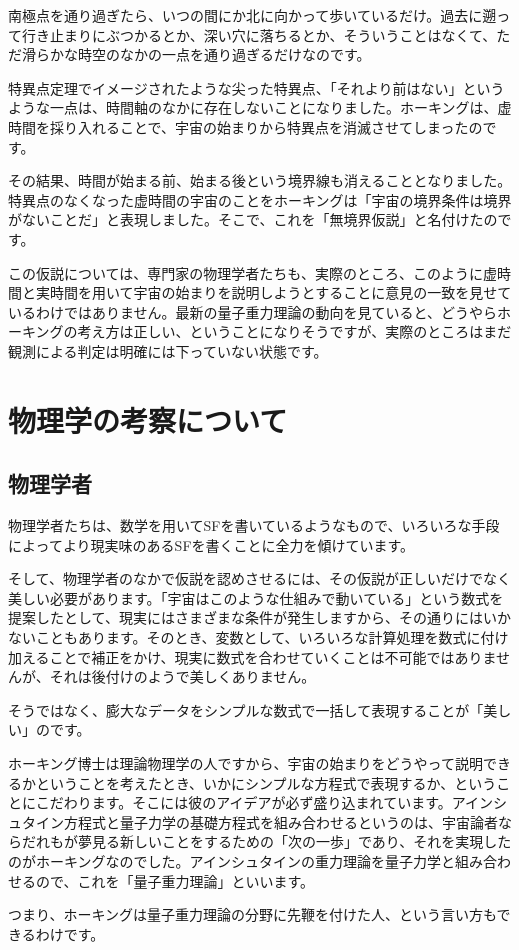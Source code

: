 \documentclass[10pt,b5paper,papersize,dvipdfmx]{jsbook}
\begin{document}
南極点を通り過ぎたら、いつの間にか北に向かって歩いているだけ。過去に遡って行き止まりにぶつかるとか、深い穴に落ちるとか、そういうことはなくて、ただ滑らかな時空のなかの一点を通り過ぎるだけなのです。\par
特異点定理でイメージされたような尖った特異点、「それより前はない」というような一点は、時間軸のなかに存在しないことになりました。ホーキングは、虚時間を採り入れることで、宇宙の始まりから特異点を消滅させてしまったのです。\par
その結果、時間が始まる前、始まる後という境界線も消えることとなりました。特異点のなくなった虚時間の宇宙のことをホーキングは「宇宙の境界条件は境界がないことだ」と表現しました。そこで、これを「無境界仮説」と名付けたのです。\par
この仮説については、専門家の物理学者たちも、実際のところ、このように虚時間と実時間を用いて宇宙の始まりを説明しようとすることに意見の一致を見せているわけではありません。最新の量子重力理論の動向を見ていると、どうやらホーキングの考え方は正しい、ということになりそうですが、実際のところはまだ観測による判定は明確には下っていない状態です。


%
\section{物理学の考察について}

\subsection{物理学者}
物理学者たちは、数学を用いてSFを書いているようなもので、いろいろな手段によってより現実味のあるSFを書くことに全力を傾けています。\par
そして、物理学者のなかで仮説を認めさせるには、その仮説が正しいだけでなく美しい必要があります。「宇宙はこのような仕組みで動いている」という数式を提案したとして、現実にはさまざまな条件が発生しますから、その通りにはいかないこともあります。そのとき、変数として、いろいろな計算処理を数式に付け加えることで補正をかけ、現実に数式を合わせていくことは不可能ではありませんが、それは後付けのようで美しくありません。\par
そうではなく、膨大なデータをシンプルな数式で一括して表現することが「美しい」のです。\par
ホーキング博士は理論物理学の人ですから、宇宙の始まりをどうやって説明できるかということを考えたとき、いかにシンプルな方程式で表現するか、ということにこだわります。そこには彼のアイデアが必ず盛り込まれています。アインシュタイン方程式と量子力学の基礎方程式を組み合わせるというのは、宇宙論者ならだれもが夢見る新しいことをするための「次の一歩」であり、それを実現したのがホーキングなのでした。アインシュタインの重力理論を量子力学と組み合わせるので、これを「量子重力理論」といいます。\par
つまり、ホーキングは量子重力理論の分野に先鞭を付けた人、という言い方もできるわけです。\par
\end{document}
